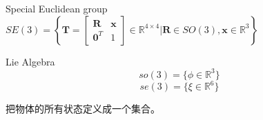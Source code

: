 \documentclass[12pt]{article}
\begin{document}
        \indent Special Euclidean group
        $SE(3)=\left\{\mathbf{T}=\begin{bmatrix}
            \mathbf{R} & \mathbf{x}\\
            \mathbf{0}^T & 1
        \end{bmatrix}\in\mathbb{R}^{4 \times 4}|\mathbf{R}\in SO(3),\mathbf{x}\in \mathbb{R}^{3}\right\}$
        
        \indent Lie Algebra
        $$so(3)=\{\phi\in \mathbb{R}^3\}$$
        $$se(3)=\{\xi\in \mathbb{R}^6\}$$

        把物体的所有状态定义成一个集合。
    
\end{document}
